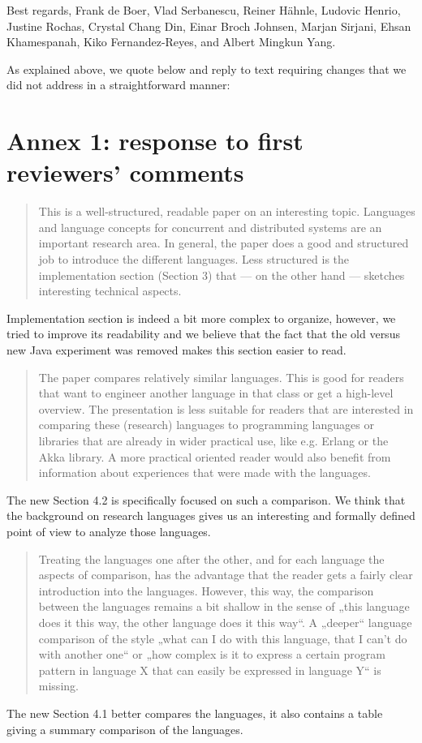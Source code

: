 \documentclass{article}
\begin{document}
\noindent
Best regards,
\newline
\noindent
Frank de Boer, Vlad Serbanescu,
	Reiner H\"ahnle,
	Ludovic Henrio, Justine Rochas,
	Crystal Chang Din, Einar Broch Johnsen,
	Marjan Sirjani,
	Ehsan Khamespanah,
	Kiko Fernandez-Reyes, and Albert Mingkun Yang.

\newpage
As explained above, we quote below and reply to text requiring changes that we did not 
address in a straightforward manner:

\section*{Annex 1: response to first reviewers' comments}

\begin{quote}
This is a well-structured, readable paper on an interesting topic. Languages and language 
concepts for concurrent and distributed systems are an important research area. In 
general, the paper does a good and structured job to introduce the different languages. 
Less structured is the implementation section (Section 3) that — on the other hand — 
sketches interesting technical aspects.
\end{quote}
Implementation section is indeed a bit more complex to organize,
however, we tried to improve its readability and we believe that the
fact that the old versus new Java experiment was removed makes this
section easier to read.


\begin{quote}
The paper compares relatively similar languages. This is good for readers that want to 
engineer another language in that class or get a high-level overview. The presentation is 
less suitable for readers that are interested in comparing these (research) languages to 
programming languages or libraries that are already in wider practical use, like e.g. 
Erlang or the Akka library. A more practical oriented reader would also benefit from 
information about experiences that were made with the languages.
\end{quote}
The new Section 4.2 is specifically focused on such a comparison. We think that the 
background on research languages gives us an interesting and formally defined point of 
view to analyze those languages.

\begin{quote}
Treating the languages one after the other, and for each language the aspects of 
comparison, has the advantage that the reader gets a fairly clear introduction into the 
languages. However, this way, the comparison between the languages remains a bit shallow 
in the sense of „this language does it this way, the other language does it this way“. A 
„deeper“ language comparison of the style „what can I do with this language, that I can’t 
do with another one“ or „how complex is it to express a certain program pattern in 
language X that can easily be expressed in language Y“ is missing. 
\end{quote}
The new Section 4.1 better compares the languages, it also contains a table giving a 
summary comparison of the languages.
\end{document}
